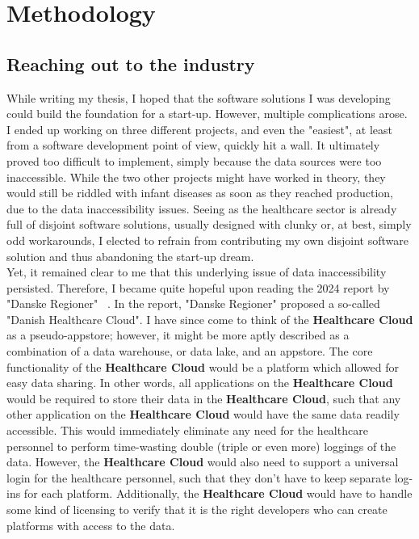 \section{Methodology}
\subsection{Reaching out to the industry}
While writing my thesis, I hoped that the software solutions I was developing could build the foundation for a start-up. However, multiple complications arose. I ended up working on three different projects, and even the "easiest", at least from a software development point of view, quickly hit a wall. It ultimately proved too difficult to implement, simply because the data sources were too inaccessible. While the two other projects might have worked in theory, they would still be riddled with infant diseases as soon as they reached production, due to the data inaccessibility issues. Seeing as the healthcare sector is already full of disjoint software solutions, usually designed with clunky or, at best, simply odd workarounds, I elected to refrain from contributing my own disjoint software solution and thus abandoning the start-up dream.
\\
Yet, it remained clear to me that this underlying issue of data inaccessibility persisted. Therefore, I became quite hopeful upon reading the 2024 report by "Danske Regioner" ~\cite{Den-Reg-digitalisation}. In the report, "Danske Regioner" proposed a so-called "Danish Healthcare Cloud". I have since come to think of the \textbf{Healthcare Cloud} as a pseudo-appstore; however, it might be more aptly described as a combination of a data warehouse, or data lake, and an appstore. The core functionality of the \textbf{Healthcare Cloud} would be a platform which allowed for easy data sharing. In other words, all applications on the \textbf{Healthcare Cloud} would be required to store their data in the \textbf{Healthcare Cloud}, such that any other application on the \textbf{Healthcare Cloud} would have the same data readily accessible. This would immediately eliminate any need for the healthcare personnel to perform time-wasting double (triple or even more) loggings of the data. However, the \textbf{Healthcare Cloud} would also need to support a universal login for the healthcare personnel, such that they don't have to keep separate log-ins for each platform. Additionally, the \textbf{Healthcare Cloud} would have to handle some kind of licensing to verify that it is the right developers who can create platforms with access to the data.
